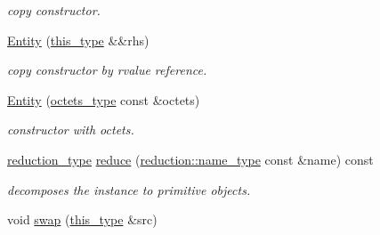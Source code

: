 \begin{DoxyCompactItemize}
\begin{DoxyCompactList}\small\item\em copy constructor. \end{DoxyCompactList}\item 
\hypertarget{classhryky_1_1uri_1_1fragment_1_1_entity_a636f0da568f48812d9ed7c76cd8e6036}{\hyperlink{classhryky_1_1uri_1_1fragment_1_1_entity_a636f0da568f48812d9ed7c76cd8e6036}{Entity} (\hyperlink{classhryky_1_1uri_1_1fragment_1_1_entity_a1432f388492da6f28248b977b9402102}{this\-\_\-type} \&\&rhs)}\label{classhryky_1_1uri_1_1fragment_1_1_entity_a636f0da568f48812d9ed7c76cd8e6036}

\begin{DoxyCompactList}\small\item\em copy constructor by rvalue reference. \end{DoxyCompactList}\item 
\hypertarget{classhryky_1_1uri_1_1fragment_1_1_entity_af3d277dae1e910f72d5be86a07298ced}{\hyperlink{classhryky_1_1uri_1_1fragment_1_1_entity_af3d277dae1e910f72d5be86a07298ced}{Entity} (\hyperlink{classhryky_1_1_vector}{octets\-\_\-type} const \&octets)}\label{classhryky_1_1uri_1_1fragment_1_1_entity_af3d277dae1e910f72d5be86a07298ced}

\begin{DoxyCompactList}\small\item\em constructor with octets. \end{DoxyCompactList}\item 
\hypertarget{classhryky_1_1uri_1_1fragment_1_1_entity_afe766a6762ecf599a7a4ceafced83624}{\hyperlink{namespacehryky_a343a9a4c36a586be5c2693156200eadc}{reduction\-\_\-type} \hyperlink{classhryky_1_1uri_1_1fragment_1_1_entity_afe766a6762ecf599a7a4ceafced83624}{reduce} (\hyperlink{namespacehryky_1_1reduction_ac686c30a4c8d196bbd0f05629a6b921f}{reduction\-::name\-\_\-type} const \&name) const }\label{classhryky_1_1uri_1_1fragment_1_1_entity_afe766a6762ecf599a7a4ceafced83624}

\begin{DoxyCompactList}\small\item\em decomposes the instance to primitive objects. \end{DoxyCompactList}\item 
\hypertarget{classhryky_1_1uri_1_1fragment_1_1_entity_a39a39632113edf53558a98dfaa739e0e}{void \hyperlink{classhryky_1_1uri_1_1fragment_1_1_entity_a39a39632113edf53558a98dfaa739e0e}{swap} (\hyperlink{classhryky_1_1uri_1_1fragment_1_1_entity_a1432f388492da6f28248b977b9402102}{this\-\_\-type} \&src)}\label{classhryky_1_1uri_1_1fragment_1_1_entity_a39a39632113edf53558a98dfaa739e0e}


\end{DoxyCompactItemize}
